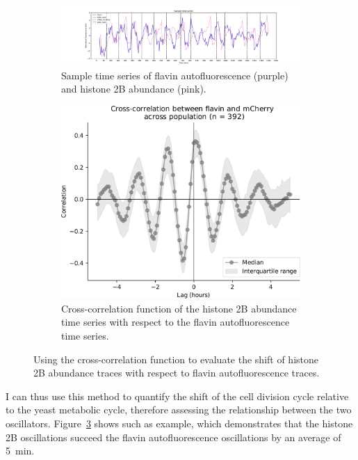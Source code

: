 \begin{figure}
  \centering
  \begin{subfigure}[t]{0.9\textwidth}
  \centering
    \includegraphics[width=\linewidth]{htb2mCherry_26643_plots_purple_01.pdf}
    \caption{
      Sample time series of flavin autofluorescence (purple) and histone 2B abundance (pink).
    }
    \label{fig:xcf-biol-ts}
  \end{subfigure}

  \begin{subfigure}[t]{0.7\textwidth}
  \centering
    \includegraphics[width=\linewidth]{xcf_edit.pdf}
    \caption{
      Cross-correlation function of the histone 2B abundance time series with respect to the flavin autofluorescence time series.
    }
    \label{fig:xcf-biol-xcf}
  \end{subfigure}

  \caption{
    Using the cross-correlation function to evaluate the shift of histone 2B abundance traces with respect to flavin autofluorescence traces.
  }
  \label{fig:xcf-biol}
\end{figure}

I can thus use this method to quantify the shift of the cell division cycle relative to the yeast metabolic cycle, therefore assessing the relationship between the two oscillators.
Figure~\ref{fig:xcf-biol} shows such as example, which demonstrates that the histone 2B oscillations succeed the flavin autofluorescence oscillations by an average of \SI{5}{\minute}.

